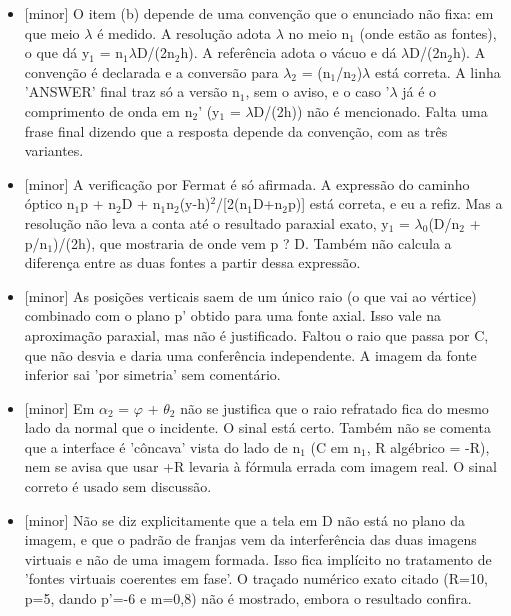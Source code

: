 \documentclass{article}%
\begin{document}
\begin{itemize}%
\item%
{[}minor{]} O item (b) depende de uma convenção que o enunciado não fixa: em que meio $\lambda$ é medido. A resolução adota $\lambda$ no meio n$_{1}$ (onde estão as fontes), o que dá y$_{1}$ = n$_{1}$$\lambda$D/(2n$_{2}$h). A referência adota o vácuo e dá $\lambda$D/(2n$_{2}$h). A convenção é declarada e a conversão para $\lambda$$_{2}$ = (n$_{1}$/n$_{2}$)$\lambda$ está correta. A linha 'ANSWER' final traz só a versão n$_{1}$, sem o aviso, e o caso '$\lambda$ já é o comprimento de onda em n$_{2}$' (y$_{1}$ = $\lambda$D/(2h)) não é mencionado. Falta uma frase final dizendo que a resposta depende da convenção, com as três variantes.%
\item%
{[}minor{]} A verificação por Fermat é só afirmada. A expressão do caminho óptico n$_{1}$p + n$_{2}$D + n$_{1}$n$_{2}$(y-h)$^2$/{[}2(n$_{1}$D+n$_{2}$p){]} está correta, e eu a refiz. Mas a resolução não leva a conta até o resultado paraxial exato, y$_{1}$ = $\lambda$$_{0}$(D/n$_{2}$ + p/n$_{1}$)/(2h), que mostraria de onde vem p ? D. Também não calcula a diferença entre as duas fontes a partir dessa expressão.%
\item%
{[}minor{]} As posições verticais saem de um único raio (o que vai ao vértice) combinado com o plano p' obtido para uma fonte axial. Isso vale na aproximação paraxial, mas não é justificado. Faltou o raio que passa por C, que não desvia e daria uma conferência independente. A imagem da fonte inferior sai 'por simetria' sem comentário.%
\item%
{[}minor{]} Em $\alpha$$_{2}$ = $\varphi$ + $\theta$$_{2}$ não se justifica que o raio refratado fica do mesmo lado da normal que o incidente. O sinal está certo. Também não se comenta que a interface é 'côncava' vista do lado de n$_{1}$ (C em n$_{1}$, R algébrico = -R), nem se avisa que usar +R levaria à fórmula errada com imagem real. O sinal correto é usado sem discussão.%
\item%
{[}minor{]} Não se diz explicitamente que a tela em D não está no plano da imagem, e que o padrão de franjas vem da interferência das duas imagens virtuais e não de uma imagem formada. Isso fica implícito no tratamento de 'fontes virtuais coerentes em fase'. O traçado numérico exato citado (R=10, p=5, dando p'=-6 e m=0,8) não é mostrado, embora o resultado confira.%
\end{itemize}%
\end{document}

